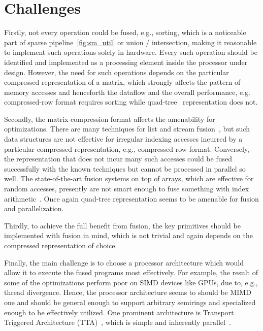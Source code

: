 \documentclass[sigplan,review,anonymous,nonacm]{acmart}\settopmatter{printfolios=true,printccs=false,printacmref=false}
\begin{document}
\section{Challenges}
Firstly, not every operation could be fused, e.g., sorting, which is a noticeable part of sparse pipeline~\ref{fig:sm_util} or union / intersection, making it reasonable to implement such operations solely in hardware. Every such operation should be identified and implemented as a processing element inside the processor under design. However, the need for such operations depends on the particular compressed representation of a matrix, which strongly affects the pattern of memory accesses and henceforth the dataflow and the overall performance, e.g. compressed-row format requires sorting while quad-tree~\cite{qtree} representation does not. 

Secondly, the matrix compression format affects the amena\-bility for optimizations. There are many techniques for list and stream fusion~\cite{StreamFusion,StreamFusion2}, but such data structures are not effective for irregular indexing accesses incurred by a particular compressed representation, e.g., compressed-row format. Conversely, the representation that does not incur many such accesses could be fused successfully with the known techniques but cannot be processed in parallel so well. The state-of-the-art fusion systems on top of arrays, which are effective for random accesses, presently are not smart enough to fuse something with index arithmetic~\cite{Futhark}. Once again quad-tree representation seems to be amenable for fusion and parallelization.

Thirdly, to achieve the full benefit from fusion, the key primitives should be implemented with fusion in mind, which is not trivial and again depends on the compressed representation of choice.

Finally, the main challenge is to choose a processor architecture which would allow it to execute the fused programs most effectively. For example, the result of some of the optimizations perform poor on SIMD devices like GPUs, due to, e.g., thread divergence. Hence, the processor architecture seems to should be MIMD one and should be general enough to support arbitrary semirings and specialized enough to be effectively utilized. One prominent architecture is Transport Triggered Architecture (TTA)~\cite{TCEToolset}, which is simple and inherently parallel~\cite{FPTTA}.
\end{document}
